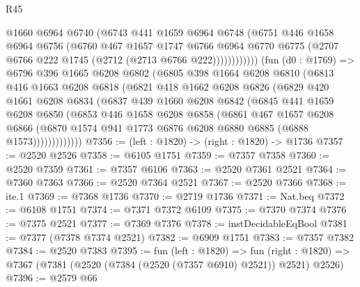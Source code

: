 \begin{lexlean}{R45}
\begin{coremodule}
                    @1660
                    @6964
                    @6740
                    (@6743
                      @441
                      @1659
                      @6964
                      @6748
                      (@6751
                        @446
                        @1658
                        @6964
                        @6756
                        (@6760
                          @467
                          @1657
                          @1747
                          @6766
                          @6964
                          @6770
                          @6775
                          (@2707 @6766 @222 @1745 (@2712 (@2713 @6766 @222))))))))))))
        (fun (d0 : @1769) =>
        @6796
          @396
          @1665
          @6208
          @6802
          (@6805
            @398
            @1664
            @6208
            @6810
            (@6813
              @416
              @1663
              @6208
              @6818
              (@6821
                @418
                @1662
                @6208
                @6826
                (@6829
                  @420
                  @1661
                  @6208
                  @6834
                  (@6837
                    @439
                    @1660
                    @6208
                    @6842
                    (@6845
                      @441
                      @1659
                      @6208
                      @6850
                      (@6853
                        @446
                        @1658
                        @6208
                        @6858
                        (@6861
                          @467
                          @1657
                          @6208
                          @6866
                          (@6870 @1574 @941 @1773 @6876 @6208 @6880 @6885 (@6888 @1573)))))))))))))
@7356 := (left : @1820) -> (right : @1820) -> @1736
@7357 := @2520 @2526
@7358 := @6105 @1751
@7359 := @7357 @7358
@7360 := @2520 @7359
@7361 := @7357 @6106
@7363 := @2520 @7361 @2521
@7364 := @7360 @7363
@7366 := @2520 @7364 @2521
@7367 := @2520 @7366
@7368 := ite.{1}
@7369 := @7368 @1736
@7370 := @2719 @1736
@7371 := Nat.beq
@7372 := @6108 @1751
@7374 := @7371 @7372 @6109
@7375 := @7370 @7374
@7376 := @7375 @2521
@7377 := @7369 @7376
@7378 := instDecidableEqBool
@7381 := @7377 (@7378 @7374 @2521)
@7382 := @6909 @1751
@7383 := @7357 @7382
@7384 := @2520 @7383
@7395 := fun (left : @1820) =>
  fun (right : @1820) => @7367 (@7381 (@2520 (@7384 (@2520 (@7357 @6910) @2521)) @2521) @2526)
@7396 := @2579 @66

\end{coremodule}
\end{lexlean}
